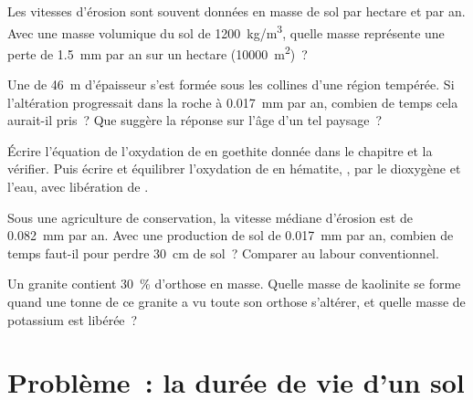 \begin{exercise}[$\star\star$]\label{exo:g10:soil-formation:11}
Les vitesses d'érosion sont souvent données en masse de sol par hectare et
par an. Avec une masse volumique du sol de \qty{1200}{kg/m^3}, quelle masse
représente une perte de \qty{1.5}{mm} par an sur un hectare
(\qty{10000}{m^2})~?
\end{exercise}

\begin{exercise}[$\star\star\star$]\label{exo:g10:soil-formation:12}
Une  de \qty{46}{m} d'épaisseur s'est formée sous les collines
d'une région tempérée. Si l'altération progressait dans la roche à
\qty{0.017}{mm} par an, combien de temps cela aurait-il pris~? Que suggère
la réponse sur l'âge d'un tel paysage~?
\end{exercise}

\begin{exercise}[$\star\star\star$]\label{exo:g10:soil-formation:13}
Écrire l'équation de l'oxydation de  en goethite donnée dans le
chapitre et la vérifier. Puis écrire et équilibrer l'oxydation de 
en hématite, , par le dioxygène et l'eau, avec libération de
.
\end{exercise}

\begin{exercise}[$\star\star\star$]\label{exo:g10:soil-formation:14}
Sous une agriculture de conservation, la vitesse médiane d'érosion est de
\qty{0.082}{mm} par an. Avec une production de sol de \qty{0.017}{mm} par
an, combien de temps faut-il pour perdre \qty{30}{cm} de sol~? Comparer au
labour conventionnel.
\end{exercise}

\begin{exercise}[$\star\star\star$]\label{exo:g10:soil-formation:15}
Un granite contient \qty{30}{\percent} d'orthose en masse. Quelle masse de
kaolinite se forme quand une tonne de ce granite a vu toute son orthose
s'altérer, et quelle masse de potassium est libérée~?
\end{exercise}

\section{Problème~: la durée de vie d'un sol}

